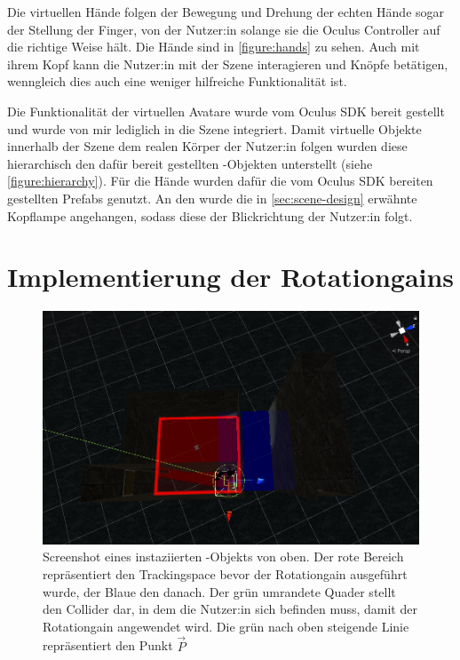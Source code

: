 Die virtuellen Hände folgen der Bewegung und Drehung der echten Hände sogar der Stellung der Finger, von der Nutzer:in solange sie die Oculus Controller auf die richtige Weise hält. Die Hände sind in \autoref{figure:hands} zu sehen.
Auch mit ihrem Kopf kann die Nutzer:in mit der Szene interagieren und Knöpfe betätigen, wenngleich dies auch eine weniger hilfreiche Funktionalität ist.

Die Funktionalität der virtuellen Avatare wurde vom Oculus SDK bereit gestellt und wurde von mir lediglich in die Szene integriert. %
Damit virtuelle Objekte innerhalb der Szene dem realen Körper der Nutzer:in folgen wurden diese hierarchisch den dafür bereit gestellten -Objekten unterstellt (siehe \autoref{figure:hierarchy}). Für die Hände wurden dafür die vom Oculus SDK bereiten gestellten Prefabs genutzt. %
An den  wurde die in \autoref{sec:scene-design} erwähnte Kopflampe angehangen, sodass diese der Blickrichtung der Nutzer:in folgt.

\section{Implementierung der Rotationgains}

\begin{figure}[!h]
    \centering
    \includegraphics[width=1\textwidth]{images/rotationredirector.png}
    \caption{Screenshot eines instaziierten -Objekts von oben. Der rote Bereich repräsentiert den Trackingspace bevor der Rotationgain ausgeführt wurde, der Blaue den danach. Der grün umrandete Quader stellt den Collider dar, in dem die Nutzer:in sich befinden muss, damit der Rotationgain angewendet wird. Die grün nach oben steigende Linie repräsentiert den Punkt $\vec{P}$}\label{figure:rotredirector}
\end{figure}

